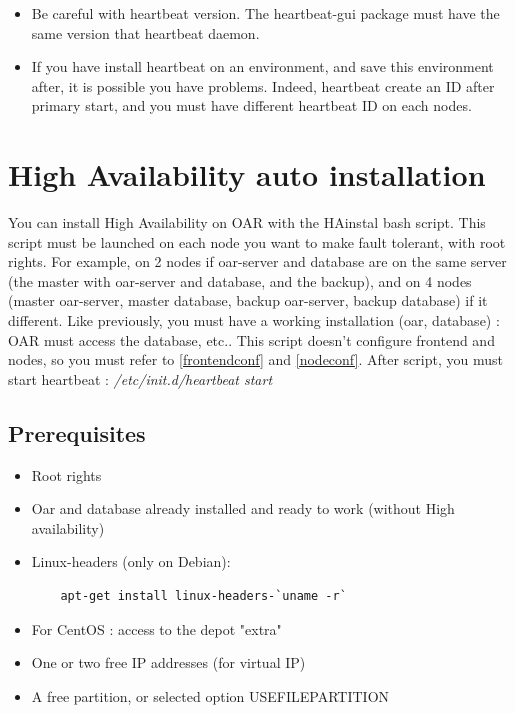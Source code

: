 \documentclass[a4paper,10pt]{report}
\begin{document}
\begin{itemize}
 \item Be careful with heartbeat version. The heartbeat-gui package must have the same version that heartbeat daemon.
 \item If you have install heartbeat on an environment, and save this environment after, it is possible you have problems. Indeed, heartbeat create an ID after primary start, and you must have different heartbeat ID on each nodes.
\end{itemize}



\chapter{High Availability auto installation}
\label{script}

You can install High Availability on OAR with the HAinstal bash script. This script must be launched on each node you want to make fault tolerant, with root rights. For example, on 2 nodes if oar-server and database are on the same server (the master with oar-server and database, and the backup), and on 4 nodes (master oar-server, master database, backup oar-server, backup database) if it different.
Like previously, you must have a working installation (oar, database) : OAR must access the database, etc.. This script doesn't configure frontend and nodes, so you must refer to \ref{frontendconf} and \ref{nodeconf}. After script, you must start heartbeat : \textit{/etc/init.d/heartbeat start}

\section{Prerequisites}
\begin{itemize}
 \item Root rights
 \item Oar and database already installed and ready to work (without High availability)
 \item Linux-headers (only on Debian): 
    \begin{lstlisting}
    apt-get install linux-headers-`uname -r`
    \end{lstlisting}
 \item For CentOS : access to the depot "extra"
 \item One or two free IP addresses (for virtual IP)
 \item A free partition, or selected option USEFILEPARTITION
\end{itemize}
\end{document}
